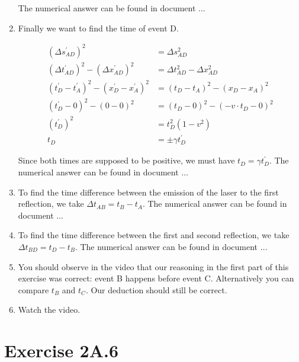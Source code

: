 \documentclass[a4paper,10pt,english]{article}
\begin{document}
\begin{enumerate}
The numerical answer can be found in document $\ldots$
\item Finally we want to find the time of event D. 

\begin{align*}
(\Delta s_{AD}^{\prime})^{2}&=\Delta s_{AD}^{2}\\
(\Delta t_{AD}^{\prime})^{2}-(\Delta x_{AD}^{\prime})^{2}&=\Delta t_{AD}^{2}-\Delta x_{AD}^{2}\\
(t_{D}^{\prime}-t_{A}^{\prime})^{2}-(x_{D}^{\prime}-x_{A}^{\prime})^{2}&=(t_{D}-t_{A})^{2}-(x_{D}-x_{A})^{2}\\
(t_{D}^{\prime}-0)^{2}-(0-0)^{2}&=(t_{D}-0)^{2}-(-v\cdot t_{D}-0)^{2}\\
(t_{D}^{\prime})^{2}&=t_{D}^{2}(1-v^{2})\\
t_{D}&=\pm\gamma t_{D}^{\prime}
\end{align*}

Since both times are supposed to be positive, we must have $t_{D}=\gamma t_{D}^{\prime}$. The numerical answer can be found in document $\ldots$
\item To find the time difference between the emission of the laser to the first reflection, we take $\Delta t_{AB}=t_{B}-t_{A}$. The numerical answer can be found in document $\ldots$
\item To find the time difference between the first and second reflection, we take $\Delta t_{BD}=t_{D}-t_{B}$. The numerical answer can be found in document $\ldots$
\item You should observe in the video that our reasoning in the first part of this exercise was correct: event B happens before event C. Alternatively you can compare $t_{B}$ and $t_{C}$. Our deduction should still be correct.
\item Watch the video.
\end{enumerate}
%
%
%
%
%
%
%
%
\section*{Exercise 2A.6}
\end{document}
